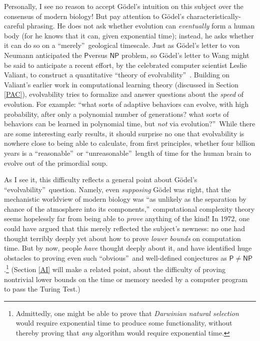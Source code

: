 \documentclass[12pt,onecolumn]{article}%
\begin{document}
Personally, I see no reason to accept G\"{o}del's intuition on this subject
over the consensus of modern biology! But pay attention to G\"{o}del's
characteristically-careful phrasing. He does not ask whether evolution can
\textit{eventually} form a human body (for he knows that it can, given
exponential time); instead, he asks whether it can do so on a
\textquotedblleft merely\textquotedblright\  geological\textit{ }timescale.
 Just as G\"{o}del's letter to von Neumann anticipated the $\mathsf{P}%
 $versus $\mathsf{NP}$ problem, so G\"{o}del's letter to Wang might be said
to anticipate a recent effort, by the celebrated computer scientist Leslie
Valiant, to construct a quantitative \textquotedblleft theory of
evolvability\textquotedblright\  \cite{valiant:evol}. Building on Valiant's
earlier work in computational learning theory (discussed in Section
\ref{PAC}), evolvability tries to formalize and answer questions about the
\textit{speed} of evolution. For example: \textquotedblleft what sorts of
adaptive behaviors can evolve, with high probability, after only a polynomial
number of generations? what sorts of behaviors can be learned in polynomial
time, but \textit{not} via evolution?\textquotedblright\  While there are
some interesting early results, it should surprise no one that evolvability is
nowhere close to being able to calculate, from first principles, whether four
billion years is a \textquotedblleft reasonable\textquotedblright\  or
\textquotedblleft unreasonable\textquotedblright\  length of time for the human
brain to evolve out of the primordial soup.

As I see it, this difficulty reflects a general point about G\"{o}del's
\textquotedblleft evolvability\textquotedblright\  question. Namely, even
\textit{supposing} G\"{o}del was right, that the mechanistic worldview of
modern biology was \textquotedblleft as unlikely as the separation by chance
of the atmosphere into its components,\textquotedblright\  computational
complexity theory seems hopelessly far from being able to \textit{prove}
anything of the kind! In 1972, one could have argued that this merely
reflected the subject's newness: no one had thought terribly deeply yet about
how to prove \textit{lower bounds} on computation time. But by now, people
\textit{have} thought deeply about it, and have identified huge obstacles to
proving even such \textquotedblleft obvious\textquotedblright\  and
well-defined conjectures as $\mathsf{P}\neq\mathsf{NP}$.\footnote{Admittedly,
one might be able to prove that \textit{Darwinian natural selection} would
require exponential time to produce some functionality, without thereby
proving that \textit{any} algorithm would require exponential time.}
 (Section \ref{AI} will make a related point, about the difficulty of proving
nontrivial lower bounds on the time or memory needed by a computer program to
pass the Turing Test.)
\end{document}
